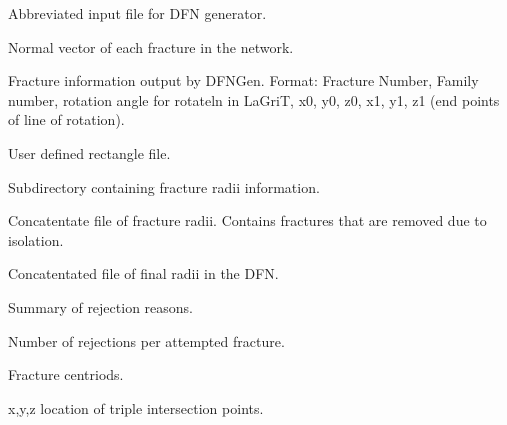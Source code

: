 \documentclass[letterpaper,10pt,english]{sphinxmanual}
\begin{document}

\label{\detokenize{output:input-generator-clean-dat}}
Abbreviated input file for DFN generator.


\label{\detokenize{output:normal-vectors-dat}}
Normal vector of each fracture in the network.


\label{\detokenize{output:poly-info-dat}}
Fracture information output by DFNGen. Format: Fracture Number, Family number, rotation angle for rotateln in LaGriT, x0, y0, z0, x1, y1, z1 (end points of line of rotation).


\label{\detokenize{output:user-rects-dat}}
User defined rectangle file.


\label{\detokenize{output:radii}}
Subdirectory containing fracture radii information.


\label{\detokenize{output:radii-dat}}
Concatentate file of fracture radii. Contains fractures that are removed due to isolation.


\label{\detokenize{output:radii-final-dat}}
Concatentated file of final radii in the DFN.


\label{\detokenize{output:rejections-dat}}
Summary of rejection reasons.


\label{\detokenize{output:rejectsperattempt-dat}}
Number of rejections per attempted fracture.


\label{\detokenize{output:translations-dat}}
Fracture centriods.


\label{\detokenize{output:triple-points-dat}}
x,y,z location of triple intersection points.

\end{document}
